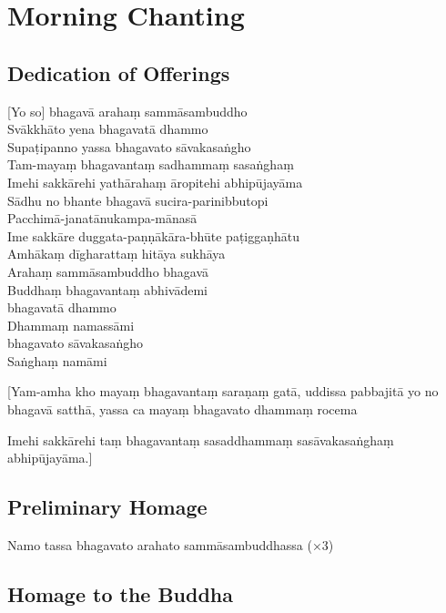 \chapter{Morning Chanting}

\section*{Dedication of Offerings}

[Yo so] bhagavā arahaṃ sammāsambuddho\\
Svākkhāto yena bhagavatā dhammo\\
Supaṭipanno yassa bhagavato sāvakasaṅgho\\
Tam-mayaṃ bhagavantaṃ sadhammaṃ sasaṅghaṃ\\
Imehi sakkārehi yathārahaṃ āropitehi abhipūjayāma\\
Sādhu no bhante bhagavā sucira-parinibbutopi\\
Pacchimā-janatānukampa-mānasā\\
Ime sakkāre duggata-paṇṇākāra-bhūte paṭiggaṇhātu\\
Amhākaṃ dīgharattaṃ hitāya sukhāya\\
Arahaṃ sammāsambuddho bhagavā\\
Buddhaṃ bhagavantaṃ abhivādemi\\\relax
[Svākkhāto] bhagavatā dhammo\\
Dhammaṃ namassāmi\\\relax
[Supaṭipanno] bhagavato sāvakasaṅgho\\
Saṅghaṃ namāmi

[Yam-amha kho mayaṃ bhagavantaṃ saraṇaṃ gatā, uddissa pabbajitā yo no bhagavā
satthā, yassa ca mayaṃ bhagavato dhammaṃ rocema

Imehi sakkārehi taṃ bhagavantaṃ sasaddhammaṃ sasāvakasaṅghaṃ abhipūjayāma.]

\section*{Preliminary Homage}

\begin{leader}
\end{leader}

Namo tassa bhagavato arahato sammāsambuddhassa (×3)

\section*{Homage to the Buddha}

